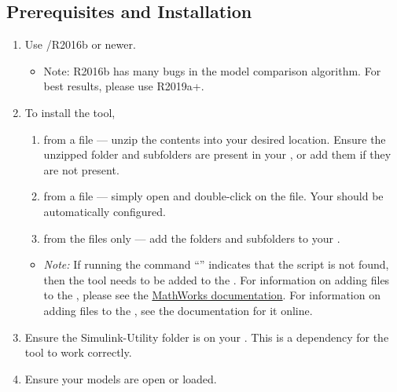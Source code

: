 \documentclass{article}
\begin{document}
\subsection{Prerequisites and Installation}

\begin{enumerate}
  \item Use \Matlab/\Simulink R2016b or newer.
		\begin{itemize}
			\item Note: R2016b has many bugs in the model comparison algorithm. For best results, please use R2019a+.
		\end{itemize}
	\item To install the tool,
	\begin{enumerate}
		\item from a  file --- unzip the contents into your desired location. Ensure the unzipped folder and subfolders are present in your \mpath, or add them if they are not present. %
		\item from a  file --- simply open \Matlab and double-click on the file. Your \mpath should be automatically configured.
		\item from the files only --- add the folders and subfolders to your \mpath. %
	\end{enumerate}
	\begin{itemize}
		\item \textit{Note:} If running the command ``'' indicates that the script is not found, then the tool needs to be added to the \mpath.
		For information on adding files to the \mpath, please see the \href{https://www.mathworks.com/help/matlab/matlab_env/add-remove-or-reorder-folders-on-the-search-path.html}{MathWorks documentation}.
		For information on adding files to the \mpath, see the documentation for it online.
	\end{itemize}
	\item Ensure the Simulink-Utility folder is on your \mpath. This is a dependency for the tool to work correctly.
	\item Ensure your models are open or loaded.
\end{enumerate}
\end{document}
